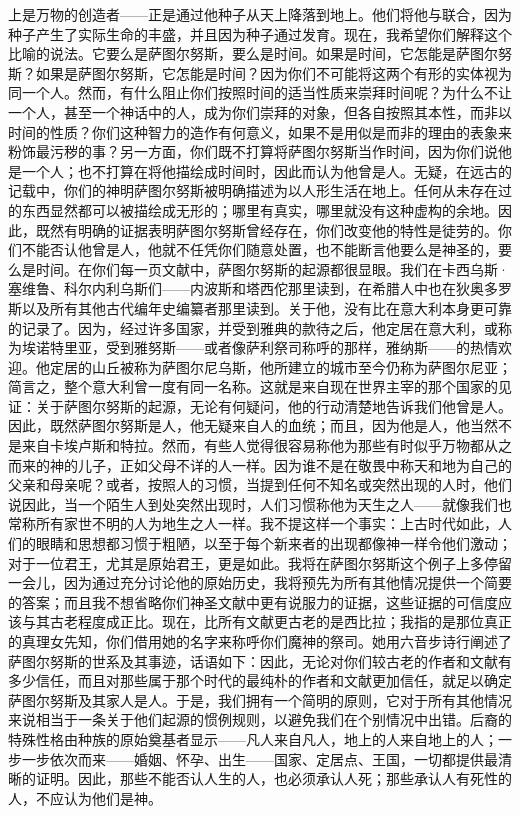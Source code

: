 上是万物的创造者——正是通过他种子从天上降落到地上。他们将他与联合，因为种子产生了实际生命的丰盛，并且因为种子通过发育。现在，我希望你们解释这个比喻的说法。它要么是萨图尔努斯，要么是时间。如果是时间，它怎能是萨图尔努斯？如果是萨图尔努斯，它怎能是时间？因为你们不可能将这两个有形的实体视为同一个人。然而，有什么阻止你们按照时间的适当性质来崇拜时间呢？为什么不让一个人，甚至一个神话中的人，成为你们崇拜的对象，但各自按照其本性，而非以时间的性质？你们这种智力的造作有何意义，如果不是用似是而非的理由的表象来粉饰最污秽的事？另一方面，你们既不打算将萨图尔努斯当作时间，因为你们说他是一个人；也不打算在将他描绘成时间时，因此而认为他曾是人。无疑，在远古的记载中，你们的神明萨图尔努斯被明确描述为以人形生活在地上。任何从未存在过的东西显然都可以被描绘成无形的；哪里有真实，哪里就没有这种虚构的余地。因此，既然有明确的证据表明萨图尔努斯曾经存在，你们改变他的特性是徒劳的。你们不能否认他曾是人，他就不任凭你们随意处置，也不能断言他要么是神圣的，要么是时间。在你们每一页文献中，萨图尔努斯的起源都很显眼。我们在卡西乌斯·塞维鲁、科尔内利乌斯们——内波斯和塔西佗那里读到，在希腊人中也在狄奥多罗斯以及所有其他古代编年史编纂者那里读到。关于他，没有比在意大利本身更可靠的记录了。因为，经过许多国家，并受到雅典的款待之后，他定居在意大利，或称为埃诺特里亚，受到雅努斯——或者像萨利祭司称呼的那样，雅纳斯——的热情欢迎。他定居的山丘被称为萨图尔尼乌斯，他所建立的城市至今仍称为萨图尔尼亚；简言之，整个意大利曾一度有同一名称。这就是来自现在世界主宰的那个国家的见证：关于萨图尔努斯的起源，无论有何疑问，他的行动清楚地告诉我们他曾是人。因此，既然萨图尔努斯是人，他无疑来自人的血统；而且，因为他是人，他当然不是来自卡埃卢斯和特拉。然而，有些人觉得很容易称他为那些有时似乎万物都从之而来的神的儿子，正如父母不详的人一样。因为谁不是在敬畏中称天和地为自己的父亲和母亲呢？或者，按照人的习惯，当提到任何不知名或突然出现的人时，他们说因此，当一个陌生人到处突然出现时，人们习惯称他为天生之人——就像我们也常称所有家世不明的人为地生之人一样。我不提这样一个事实：上古时代如此，人们的眼睛和思想都习惯于粗陋，以至于每个新来者的出现都像神一样令他们激动；对于一位君王，尤其是原始君王，更是如此。我将在萨图尔努斯这个例子上多停留一会儿，因为通过充分讨论他的原始历史，我将预先为所有其他情况提供一个简要的答案；而且我不想省略你们神圣文献中更有说服力的证据，这些证据的可信度应该与其古老程度成正比。现在，比所有文献更古老的是西比拉；我指的是那位真正的真理女先知，你们借用她的名字来称呼你们魔神的祭司。她用六音步诗行阐述了萨图尔努斯的世系及其事迹，话语如下：因此，无论对你们较古老的作者和文献有多少信任，而且对那些属于那个时代的最纯朴的作者和文献更加信任，就足以确定萨图尔努斯及其家人是人。于是，我们拥有一个简明的原则，它对于所有其他情况来说相当于一条关于他们起源的惯例规则，以避免我们在个别情况中出错。后裔的特殊性格由种族的原始奠基者显示——凡人来自凡人，地上的人来自地上的人；一步一步依次而来——婚姻、怀孕、出生——国家、定居点、王国，一切都提供最清晰的证明。因此，那些不能否认人生的人，也必须承认人死；那些承认人有死性的人，不应认为他们是神。\par

